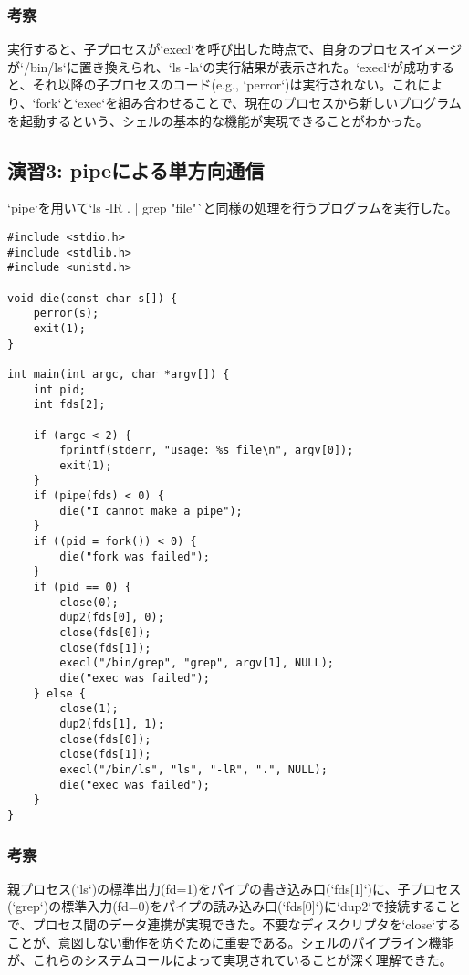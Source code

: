 \documentclass[a4paper,11pt,dvipdfmx]{jsarticle}
\begin{document}
\subsubsection{考察}
実行すると、子プロセスが`execl`を呼び出した時点で、自身のプロセスイメージが`/bin/ls`に置き換えられ、`ls -la`の実行結果が表示された。`execl`が成功すると、それ以降の子プロセスのコード(e.g., `perror`)は実行されない。これにより、`fork`と`exec`を組み合わせることで、現在のプロセスから新しいプログラムを起動するという、シェルの基本的な機能が実現できることがわかった。

\subsection{演習3: pipeによる単方向通信}
`pipe`を用いて`ls -lR . | grep "file"`と同様の処理を行うプログラムを実行した。
\begin{lstlisting}[caption={pipe\_oneway.c}, label=lst:pipe_oneway]
#include <stdio.h>
#include <stdlib.h>
#include <unistd.h>

void die(const char s[]) {
    perror(s);
    exit(1);
}

int main(int argc, char *argv[]) {
    int pid;
    int fds[2];

    if (argc < 2) {
        fprintf(stderr, "usage: %s file\n", argv[0]);
        exit(1);
    }
    if (pipe(fds) < 0) {
        die("I cannot make a pipe");
    }
    if ((pid = fork()) < 0) {
        die("fork was failed");
    }
    if (pid == 0) {
        close(0);
        dup2(fds[0], 0);
        close(fds[0]);
        close(fds[1]);
        execl("/bin/grep", "grep", argv[1], NULL);
        die("exec was failed");
    } else {
        close(1);
        dup2(fds[1], 1);
        close(fds[0]);
        close(fds[1]);
        execl("/bin/ls", "ls", "-lR", ".", NULL);
        die("exec was failed");
    }
}
\end{lstlisting}
\subsubsection{考察}
親プロセス(`ls`)の標準出力(fd=1)をパイプの書き込み口(`fds[1]`)に、子プロセス(`grep`)の標準入力(fd=0)をパイプの読み込み口(`fds[0]`)に`dup2`で接続することで、プロセス間のデータ連携が実現できた。不要なディスクリプタを`close`することが、意図しない動作を防ぐために重要である。シェルのパイプライン機能が、これらのシステムコールによって実現されていることが深く理解できた。
\end{document}
